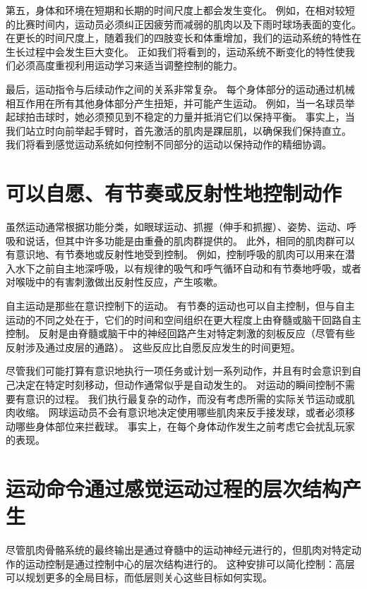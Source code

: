 第五，身体和环境在短期和长期的时间尺度上都会发生变化。
例如，在相对较短的比赛时间内，运动员必须纠正因疲劳而减弱的肌肉以及下雨时球场表面的变化。
在更长的时间尺度上，随着我们的四肢变长和体重增加，我们的运动系统的特性在生长过程中会发生巨大变化。
正如我们将看到的，运动系统不断变化的特性使我们必须高度重视利用运动学习来适当调整控制的能力。


最后，运动指令与后续动作之间的关系非常复杂。
每个身体部分的运动通过机械相互作用在所有其他身体部分产生扭矩，并可能产生运动。
例如，当一名球员举起球拍击球时，她必须预见到不稳定的力量并抵消它们以保持平衡。
事实上，当我们站立时向前举起手臂时，首先激活的肌肉是踝屈肌，以确保我们保持直立。
我们将看到感觉运动系统如何控制不同部分的运动以保持动作的精细协调。



\section{可以自愿、有节奏或反射性地控制动作}

虽然运动通常根据功能分类，如眼球运动、抓握（伸手和抓握）、姿势、运动、呼吸和说话，但其中许多功能是由重叠的肌肉群提供的。
此外，相同的肌肉群可以有意识地、有节奏地或反射性地受到控制。
例如，控制呼吸的肌肉可以用来在潜入水下之前自主地深呼吸，以有规律的吸气和呼气循环自动和有节奏地呼吸，或者对喉咙中的有害刺激做出反射性反应，产生咳嗽。


自主运动是那些在意识控制下的运动。
有节奏的运动也可以自主控制，但与自主运动的不同之处在于，它们的时间和空间组织在更大程度上由脊髓或脑干回路自主控制。
反射是由脊髓或脑干中的神经回路产生对特定刺激的刻板反应（尽管有些反射涉及通过皮层的通路）。
这些反应比自愿反应发生的时间更短。


尽管我们可能打算有意识地执行一项任务或计划一系列动作，并且有时会意识到自己决定在特定时刻移动，但动作通常似乎是自动发生的。
对运动的瞬间控制不需要有意识的过程。
我们执行最复杂的动作，而没有考虑所需的实际关节运动或肌肉收缩。
网球运动员不会有意识地决定使用哪些肌肉来反手接发球，或者必须移动哪些身体部位来拦截球。
事实上，在每个身体动作发生之前考虑它会扰乱玩家的表现。



\section{运动命令通过感觉运动过程的层次结构产生}

尽管肌肉骨骼系统的最终输出是通过脊髓中的运动神经元进行的，但肌肉对特定动作的运动控制是通过控制中心的层次结构进行的。
这种安排可以简化控制：高层可以规划更多的全局目标，而低层则关心这些目标如何实现。


